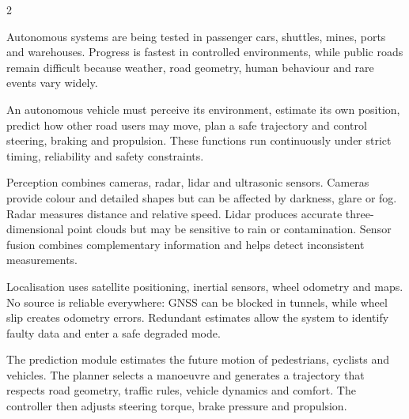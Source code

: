 

\begin{multicols}{2}
\begin{engineeringnews}
Autonomous systems are being tested in passenger cars, shuttles, mines, ports and warehouses. Progress
is fastest in controlled environments, while public roads remain difficult because weather, road
geometry, human behaviour and rare events vary widely.
\end{engineeringnews}

\begin{ecarticle}
An autonomous vehicle must perceive its environment, estimate its own position, predict how other road
users may move, plan a safe trajectory and control steering, braking and propulsion. These functions run
continuously under strict timing, reliability and safety constraints.

Perception combines cameras, radar, lidar and ultrasonic sensors. Cameras provide colour and detailed
shapes but can be affected by darkness, glare or fog. Radar measures distance and relative speed. Lidar
produces accurate three-dimensional point clouds but may be sensitive to rain or contamination. Sensor
fusion combines complementary information and helps detect inconsistent measurements.

Localisation uses satellite positioning, inertial sensors, wheel odometry and maps. No source is
reliable everywhere: GNSS can be blocked in tunnels, while wheel slip creates odometry errors. Redundant
estimates allow the system to identify faulty data and enter a safe degraded mode.

The prediction module estimates the future motion of pedestrians, cyclists and vehicles. The planner
selects a manoeuvre and generates a trajectory that respects road geometry, traffic rules, vehicle
dynamics and comfort. The controller then adjusts steering torque, brake pressure and propulsion.


\end{ecarticle}
\end{multicols}
